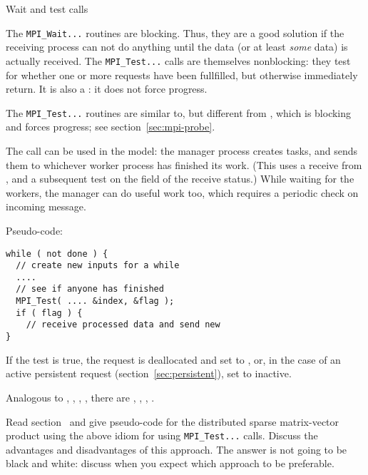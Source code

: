 
 {Wait and test calls}
\label{sec:mpitest}
\label{sec:mpi-test}

The \lstinline{MPI_Wait...} routines are blocking. Thus, they are a good solution if 
the receiving process can not do anything until the data 
(or at least \emph{some} data) is actually received.
The \lstinline{MPI_Test...} calls are themselves nonblocking: they
test for whether one or more requests have been
fullfilled, but otherwise immediately return.
It is also a : it does not force progress.

\begin{remark}
  The \lstinline{MPI_Test...} routines are similar to, but different from
  , which is blocking and forces progress;
  see section~\ref{sec:mpi-probe}.
\end{remark}

The  call can be used in the
 model: the manager process creates tasks, and
sends them to whichever worker process has finished its work.
(This uses a receive from , and a
subsequent test on the  field of the receive status.)
While waiting for the workers, the manager can do useful work too,
which requires a periodic check on incoming message.

Pseudo-code:
\begin{lstlisting}
while ( not done ) {
  // create new inputs for a while
  ....
  // see if anyone has finished
  MPI_Test( .... &index, &flag );
  if ( flag ) {
    // receive processed data and send new
}
\end{lstlisting}

If the test is true, the request is deallocated and set to ,
or, in the case of an active persistent request
(section~\ref{sec:persistent}),
set to inactive.

Analogous to , ,
, ,
there are
,
,
,
.

\begin{exercise}
  Read section~ and give pseudo-code for the
    distributed sparse matrix-vector product using the above idiom for
    using \lstinline{MPI_Test...} calls. Discuss the advantages and
    disadvantages of this approach. The answer is not going to be
    black and white: discuss when you expect which approach to be
    preferable.
\end{exercise}

